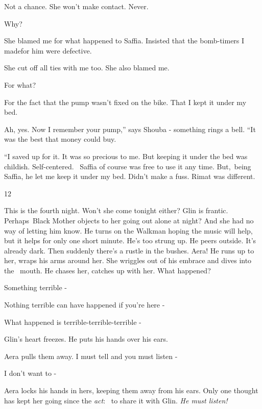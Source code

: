 \documentclass[letterpaper]{article}
\begin{document}
{\textquotedbl}Not a chance. She won't make contact. Never.{\textquotedbl} 

{\textquotedbl}Why?{\textquotedbl} 

{\textquotedbl}She blamed me for what happened to Saffia. Insisted that the bomb-timers I madefor him were
defective.{\textquotedbl} 

{\textquotedbl}She cut off all ties with me too. She also blamed me.{\textquotedbl} 

{\textquotedbl}For what?{\textquotedbl}~ 

{\textquotedbl}For the fact that the pump wasn't fixed on the bike. That I kept it under my bed.{\textquotedbl} 

{\textquotedbl}Ah, yes. Now I remember your pump,'' says Shouba - something rings a bell. ``It was the best that money
could buy.{\textquotedbl}

{}``I saved up for it. It was so precious to me. But keeping it under the bed was childish. Self-centered. \ Saffia of
course was free to use it any time. But,~being Saffia, he let me keep it under my bed. Didn't make a fuss. Rimat was
different.{\textquotedbl} 


\bigskip

12~

This is the fourth night. Won't she come tonight either? Glin is frantic. Perhaps~Black Mother objects to her going out
alone at night? And she had no way of letting him know. He turns on the Walkman hoping the music will help, but it
helps for only one short minute. He's too strung up. He peers outside. It's already dark. Then suddenly there's a
rustle in the bushes. Aera! He runs up to her, wraps his arms around her. She wriggles out of his embrace and dives
into the \ mouth. He chases her, catches up with her. {\textquotedbl}What happened?{\textquotedbl} 

{\textquotedbl}Something terrible -{\textquotedbl} 

{\textquotedbl}Nothing terrible can have happened if you're here -{\textquotedbl} 

{\textquotedbl}What happened is terrible-terrible-terrible -{\textquotedbl} 

Glin's heart freezes. He puts his hands over his ears. 

Aera pulls them away. {\textquotedbl}I must tell and you must listen -{\textquotedbl} 

{\textquotedbl}I don't want to -{\textquotedbl} 

Aera locks his hands in hers, keeping them away from his ears. Only one thought has kept her going since the
\textit{act}: \ to share it with Glin. \textit{He must listen! }
\end{document}
